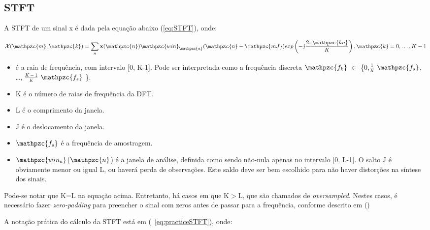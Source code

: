     \subsection{STFT}
        A STFT de um sinal x é dada pela equação abaixo (\ref{eq:STFT}), onde:

    \begin{equation}\label{eq:STFT}
        \mathcal{X}(\mathpzc{m},\mathpzc{k})
        = \sum_{n} \mathbf{x}(\mathpzc{n})
        \mathpzc{win}_\mathpzc{a}(\mathpzc{n} - \mathpzc{mJ})
        exp \left( -j \frac{2\pi\mathpzc{kn}}{K} \right), \mathpzc{k} = 0, \dots, K-1
    \end{equation}


        \begin{itemize}
            
            \item {} é a raia de frequência, com intervalo [0, K-1]. Pode ser interpretada como a frequência discreta $\mathpzc{f_k}$ $\in$ \big\{0,$\frac{1}{K}$ $\mathpzc{f_s}$, \dots, $\frac{K-1}{K}$ $\mathpzc{f_s}$ \big\}.
                        
            \item K é o número de raias de frequência da DFT.
                        
            \item L é o comprimento da janela.
                        
            \item J é o deslocamento da janela.
            
            \item  $\mathpzc{f_s}$ é a frequência de amostragem.
            
            \item $\mathpzc{win_a}$($\mathpzc{n}$) é a janela de análise, definida como sendo não-nula apenas no intervalo [0, L-1]. O salto J é obviamente menor ou igual L, ou haverá perda de observações. Este saldo deve ser bem escolhido para não haver distorções na síntese dos sinais.
        \end{itemize}
    
        Pode-se notar que K=L na equação acima. Entretanto, há casos em que K$>$L, que são chamados de \textit{oversampled}. Nestes casos, é necessário fazer \textit{zero-padding} para preencher o sinal com zeros antes de passar para a frequência, conforme descrito em (\cite{STFT})
        
        A notação prática do cálculo da STFT está em (~\ref{eq:practiceSTFT}), onde:


